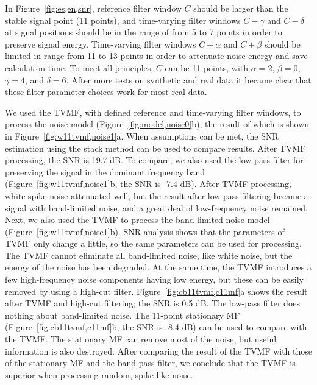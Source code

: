 In Figure~\ref{fig:es,en,snr}, reference filter window $C$ should be larger than 
the stable signal point (11 points), and time-varying filter windows
$C-\gamma$ and $C-\delta$ at signal positions should be in the range of from 5 to 
7 points in order to preserve signal energy. Time-varying filter windows $C+\alpha$
and $C+\beta$ should be limited in range from 11 to 13 points in order to 
attenuate noise energy and save calculation time. To meet all principles, $C$ can be 
11 points, with $\alpha=2$, $\beta=0$, $\gamma=4$, and $\delta=6$. 
After more tests on synthetic and real data it became clear that these filter 
parameter choices work for most real data.

We used the TVMF, with defined reference and time-varying filter windows, to process the 
noise model (Figure~\ref{fig:model,noise0}b), the result of which is shown in Figure~\ref{fig:w11tvmf,noise1}a. 
When assumptions can be met, the SNR estimation using the stack method can be 
used to compare results. After TVMF processing, the SNR is 19.7 dB. To compare, we also 
used the low-pass filter for preserving the 
signal in the dominant frequency band (Figure~\ref{fig:w11tvmf,noise1}b, the SNR is -7.4 dB). After 
TVMF processing, white spike noise attenuated well, but the result after 
low-pass filtering became a signal with 
band-limited noise, and a great deal of low-frequency noise remained. Next, we 
also used the TVMF to process the band-limited noise model 
(Figure~\ref{fig:w11tvmf,noise1}b). SNR analysis shows that the parameters of TVMF only change a little, so 
the same parameters can be used for processing. The TVMF cannot 
eliminate all band-limited noise, like white noise, but the 
energy of the noise has been degraded. At the same time, the TVMF introduces 
a few high-frequency noise components having low energy, but these can be easily 
removed by using a high-cut filter. Figure~\ref{fig:cb11tvmf,c11mf}a shows the result after
TVMF and high-cut filtering; the SNR is 0.5 dB. The low-pass filter does 
nothing about band-limited noise. The 11-point 
stationary MF (Figure~\ref{fig:cb11tvmf,c11mf}b, the SNR is -8.4 dB) 
can be used to compare with the TVMF. The stationary MF can 
remove most of the noise, but useful information is also destroyed. After comparing 
the result of the TVMF with those of the stationary MF and the band-pass filter, 
we conclude that the TVMF is superior when processing random, spike-like noise. 

